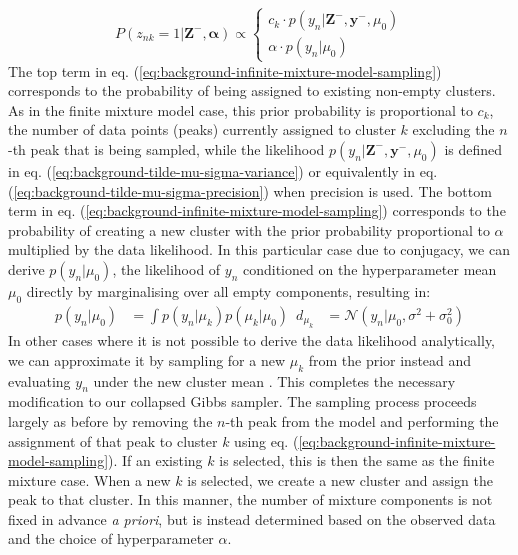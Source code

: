 \begin{equation}
P(z_{nk}=1 \vert \boldsymbol{Z}^{-}, \boldsymbol{\alpha}) \propto 
\begin{cases}
    c_k \cdot p(y_n \vert \boldsymbol{Z}^{-},  \boldsymbol{y}^{-}, \mu_0) \\
    \alpha \cdot p(y_n \vert \mu_0)
\end{cases}
\label{eq:background-infinite-mixture-model-sampling}
\end{equation}
The top term in eq. (\ref{eq:background-infinite-mixture-model-sampling}) corresponds to the probability of being assigned to existing non-empty clusters. As in the finite mixture model case, this prior probability is proportional to $c_k$, the number of data points (peaks) currently assigned to cluster $k$ excluding the $n$-th peak that is being sampled, while the likelihood $p(y_n \vert \boldsymbol{Z}^{-},  \boldsymbol{y}^{-}, \mu_0)$ is defined in eq. (\ref{eq:background-tilde-mu-sigma-variance}) or equivalently in eq. (\ref{eq:background-tilde-mu-sigma-precision}) when precision is used. The bottom term in eq. (\ref{eq:background-infinite-mixture-model-sampling}) corresponds to the probability of creating a new cluster with the prior probability proportional to $\alpha$ multiplied by the data likelihood. In this particular case due to conjugacy, we can derive $p(y_n \vert \mu_0)$, the likelihood of $y_n$ conditioned on the hyperparameter mean $\mu_0$ directly by marginalising over all empty components, resulting in:
\begin{equation}
\begin{aligned}
p(y_n \vert \mu_0) &= \int p(y_n \vert \mu_k) p(\mu_k \vert \mu_0) \enspace d_{\mu_k}
                               &= \mathcal{N}(y_n \vert \mu_0, \sigma^2 + \sigma_0^2)
\end{aligned}
\label{eq:background-new-table-likelihood}
\end{equation}
In other cases where it is not possible to derive the data likelihood analytically, we can approximate it by sampling for a new $\mu_k$ from the prior instead and evaluating $y_n$ under the new cluster mean \cite{Rasmussen2000}. This completes the necessary modification to our collapsed Gibbs sampler. The sampling process proceeds largely as before by removing the $n$-th peak from the model and performing the assignment of that peak to cluster $k$ using eq. (\ref{eq:background-infinite-mixture-model-sampling}). If an existing $k$ is selected, this is then the same as the finite mixture case. When a new $k$ is selected, we create a new cluster and assign the peak to that cluster. In this manner, the number of mixture components is not fixed in advance \textit{a priori}, but is instead determined based on the observed data and the choice of hyperparameter $\alpha$.

